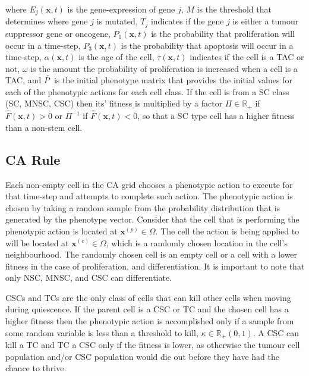 \documentclass[\main/thesis.tex]{subfiles}
\begin{document}
where $E_j(\boldsymbol{x}, t)$ is the gene-expression of gene $j$, $\overline{M}$ is the threshold that determines where gene $j$ is mutated, $T_j$ indicates if the gene $j$ is either a tumour suppressor gene or oncogene, $P_1(\boldsymbol{x}, t)$ is the probability that proliferation will occur in a time-step, $P_3(\boldsymbol{x}, t)$ is the probability that apoptosis will occur in a time-step, $\alpha(\boldsymbol{x}, t)$ is the age of the cell, $\overline{\tau}(\boldsymbol{x}, t)$ indicates if the cell is a TAC or not, $\omega$ is the amount the probability of proliferation is increased when a cell is a TAC, and $\Tilde{P}$ is the initial phenotype matrix that provides the initial values for each of the phenotypic actions for each cell class.
If the cell is from a SC class (SC, MNSC, CSC) then its' fitness is multiplied by a factor $\Pi {\in} \mathbb{R}_+$ if $\hat{F}(\boldsymbol{x}, t) {>} 0$ or $\Pi^{-1}$ if $\hat{F}(\boldsymbol{x}, t) {<} 0$, so that a SC type cell has a higher fitness than a non-stem cell.

\subsection{CA Rule}
Each non-empty cell in the CA grid chooses a phenotypic action to execute for that 
time-step and attempts to complete such action. The phenotypic action is chosen by 
taking a random sample from the probability distribution that is generated by the 
phenotype vector. Consider that the cell that is performing the phenotypic action
is located at $\boldsymbol{x}^{(p)} {\in} \Omega$. The cell the action is being applied to 
will be located at $\boldsymbol{x}^{(c)} {\in} \Omega$, which is a randomly chosen 
location in the cell's neighbourhood. The randomly chosen cell is an empty cell or a cell with a lower fitness in the case of proliferation, and differentiation. It is important to note that only NSC, MNSC, and CSC can differentiate.

CSCs and TCs are the only class of cells that can kill other cells when moving during quiescence. If the parent cell is a CSC or TC and the chosen cell has a higher fitness then the phenotypic action is accomplished only if a sample from some random variable 
is less than a threshold to kill, $\kappa {\in} \mathbb{R}_+(0, 1)$. A CSC can kill a TC and TC a CSC only if the fitness is lower, as otherwise the tumour cell population and/or CSC population would die out before they have had the chance to thrive. 
\end{document}
